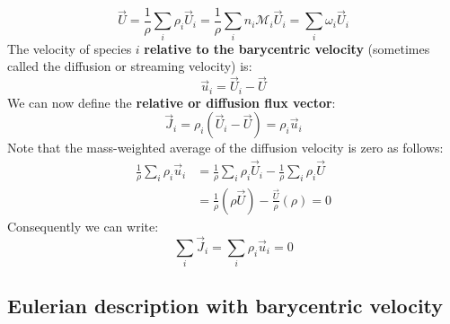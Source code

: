 \begin{equation}
\vec{U} = \frac{1}{\rho} \sum_i \rho_i \vec{U}_i = \frac{1}{\rho} \sum_i n_i \mathcal{M}_i \vec{U}_i = \sum_i \omega_i \vec{U}_i
\label{eq:barycentric}
\end{equation}
The velocity of species $i$ \textbf{relative to the barycentric velocity} (sometimes called the diffusion or streaming velocity) is:
\begin{equation}
\vec{u}_i = \vec{U}_i - \vec{U}
\label{eq:diffusionvelocity}
\end{equation}
We can now define the \textbf{relative or diffusion flux vector}:
\begin{equation}
\vec{J}_i = \rho_i ( \vec{U}_i - \vec{U}) = \rho_i \vec{u}_i
\label{eq:diffusionflux}
\end{equation}
Note that the mass-weighted average of the diffusion velocity is zero as follows:
\begin{align}
\frac{1}{\rho} \sum_i \rho_i \vec{u}_i &= \frac{1}{\rho} \sum_i \rho_i \vec{U}_i - \frac{1}{\rho} \sum_i \rho_i \vec{U}\\
&= \frac{1}{\rho} (\rho \vec{U}) - \frac{\vec{U}}{\rho} (\rho) = 0
\end{align}
Consequently we can write:
\begin{equation}
\sum_i \vec{J}_i = \sum_i \rho_i \vec{u}_i = 0
\end{equation}
\subsection{Eulerian description with barycentric velocity}
\\

